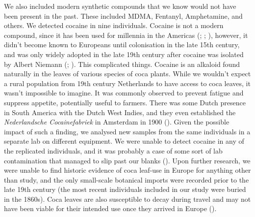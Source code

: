\documentclass[
  b5paper,
]{book}
\begin{document}
We also included modern synthetic compounds that we know would not have
been present in the past. These included MDMA, Fentanyl, Amphetamine,
and others. We detected cocaine in nine individuals. Cocaine is not a
modern compound, since it has been used for millennia in the Americas
(;
;
), however, it didn't become known to Europeans until colonisation
in the late 15th century, and was only widely adopted in the late 19th
century after cocaine was isolated by Albert Niemann
(;
). This complicated things.
Cocaine is an alkaloid found naturally in the leaves of various species
of coca plants. While we wouldn't expect a rural population from 19th
century Netherlands to have access to coca leaves, it wasn't impossible
to imagine. It was commonly observed to prevent fatigue and suppress
appetite, potentially useful to farmers. There was some Dutch presence
in South America with the Dutch West Indies, and they even established
the \emph{Nederlandsche Cocainefabriek} in Amsterdam in 1900
(). Given the possible
impact of such a finding, we analysed new samples from the same
individuals in a separate lab on different equipment. We were unable to
detect cocaine in any of the replicated individuals, and it was probably
a case of some sort of lab contamination that managed to slip past our
blanks (). Upon further research, we were unable to
find historic evidence of coca leaf-use in Europe for anything other
than study, and the only small-scale botanical imports were recorded
prior to the late 19th century (the most recent individuals included in
our study were buried in the 1860s). Coca leaves are also susceptible to
decay during travel and may not have been viable for their intended use
once they arrived in Europe ().
\end{document}
